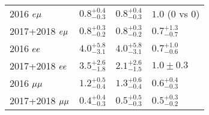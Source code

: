 \begin{table}[ht]
\begin{tabular}{llll}
\hline
2016 $e{\mu}$       & $0.8^{+0.4}_{-0.3}$ & $0.8^{+0.4}_{-0.3}$ & $1.0$ (0 vs 0)      \\
2017+2018 $e{\mu}$  & $0.8^{+0.3}_{-0.2}$ & $0.8^{+0.3}_{-0.2}$ & $0.7^{+1.3}_{-0.7}$ \\
2016 $ee$        & $4.0^{+5.8}_{-3.1}$ & $4.0^{+5.8}_{-3.1}$ & $0.7^{+1.0}_{-0.6}$ \\
2017+2018 $ee$   & $3.5^{+2.6}_{-1.8}$ & $2.1^{+2.6}_{-1.5}$ & $1.0\pm0.3$         \\
2016 ${\mu}{\mu}$      & $1.2^{+0.5}_{-0.4}$ & $1.3^{+0.6}_{-0.4}$ & $0.6^{+0.4}_{-0.3}$ \\
2017+2018 ${\mu}{\mu}$ & $0.4^{+0.4}_{-0.3}$ & $0.5^{+0.5}_{-0.3}$ & $0.5^{+0.3}_{-0.2}$ \\
\hline
\end{tabular}
\end{table}

